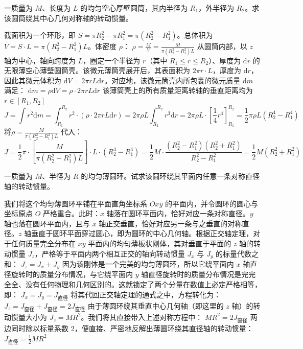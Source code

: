 \begin{example}
 一质量为 $M$、长度为 $L$ 的均匀空心厚壁圆筒，其内半径为 $R_1$，外半径为 $R_2$。求该圆筒绕其中心几何对称轴的转动惯量。
\end{example}
\begin{solution}
 截面积为一个环形，即 $S = \pi R_2^2 - \pi R_1^2 = \pi(R_2^2 - R_1^2)$。总体积为 $V = S \cdot L = \pi(R_2^2 - R_1^2)L$。体密度 $\rho$： \(\rho = \frac{M}{V} = \frac{M}{\pi(R_2^2 - R_1^2)L}\) 
 从圆筒内部，以 $z$ 轴为中心，轴向跨度为 $L$，圈定一个半径为 $r$（其中 $R_1 \le r \le R_2$）、厚度为 $\mathrm{d}r$ 的无限薄空心薄壁圆筒壳。该微元薄筒壳展开后，其表面积为 $2\pi r \cdot L$，厚度为 $\mathrm{d}r$，因此其微元体积为 $\mathrm{d}V = 2\pi r L \mathrm{d}r$。对应地，该微元筒壳内所包裹的微元质量 $\mathrm{d}m$ 满足： \(\mathrm{d}m = \rho \mathrm{d}V = \rho \cdot 2\pi r L \mathrm{d}r\) 
 该薄筒壳上的所有质量距离转轴的垂直距离均为 $r\in [R_1, R_2]$
 $$J = \int r^2 \mathrm{d}m = \int_{R_1}^{R_2} r^2 \cdot \left( \rho \cdot 2\pi r L \mathrm{d}r \right)= 2\pi \rho L \int_{R_1}^{R_2} r^3 \mathrm{d}r= 2\pi \rho L \cdot \left[ \frac{1}{4}r^4 \right]_{R_1}^{R_2} = \frac{1}{2}\pi \rho L (R_2^4 - R_1^4)$$
 将$\rho = \frac{M}{\pi(R_2^2 - R_1^2)L}$ 代入：
 $$J = \frac{1}{2}\pi \cdot \left[ \frac{M}{\pi(R_2^2 - R_1^2)L} \right] \cdot L \cdot (R_2^4 - R_1^4)= \frac{1}{2}M \cdot \frac{(R_2^2 - R_1^2)(R_2^2 + R_1^2)}{R_2^2 - R_1^2} = \frac{1}{2}M(R_2^2 + R_1^2)$$
\end{solution}

\begin{example}
一质量为 $M$、半径为 $R$ 的均匀薄圆环。试求该圆环绕其平面内任意一条对称直径轴的转动惯量。
\end{example}
\begin{solution}
 我们将这个均匀薄圆环平铺在平面直角坐标系 $Oxy$ 的平面内，并令圆环的圆心与坐标原点 $O$ 严格重合。此时：$x$ 轴落在圆环平面内，恰好对应一条对称直径。$y$ 轴也落在圆环平面内，且与 $x$ 轴正交垂直，恰好对应另一条与之垂直的对称直径。$z$ 轴垂直于圆环平面穿过圆心，即为圆环的中心几何轴。根据正交轴定理，对于任何质量完全分布在 $xy$ 平面内的均匀薄板状刚体，其对垂直于平面的 $z$ 轴的转动惯量 $J_z$，严格等于平面内两个相互正交的轴向转动惯量 $J_x$ 与 $J_y$ 的标量代数之和： \(J_z = J_x + J_y\) 因为该刚体是一个完美的均匀薄圆环，所以它绕平面内 $x$ 轴直径旋转时的质量分布情况，与它绕平面内 $y$ 轴直径旋转时的质量分布情况是完完全全、没有任何物理和几何区别的。这就锁定了两个分量在数值上必定严格相等，即： \(J_x = J_y = J_{\text{直径}}\) 将其代回正交轴定理的通式之中，方程转化为： \(J_z = J_{\text{直径}} + J_{\text{直径}} = 2J_{\text{直径}}\) 由于薄圆环绕其垂直中心几何轴（即这里的 $z$ 轴）的转动惯量大小为 $J_z = MR^2$。我们将其直接带入上述对称方程中： \(MR^2 = 2J_{\text{直径}}\) 两边同时除以标量系数 2，便直接、严密地反解出薄圆环绕其直径轴的转动惯量： \(J_{\text{直径}} = \frac{1}{2}MR^2\) 
\end{solution}

